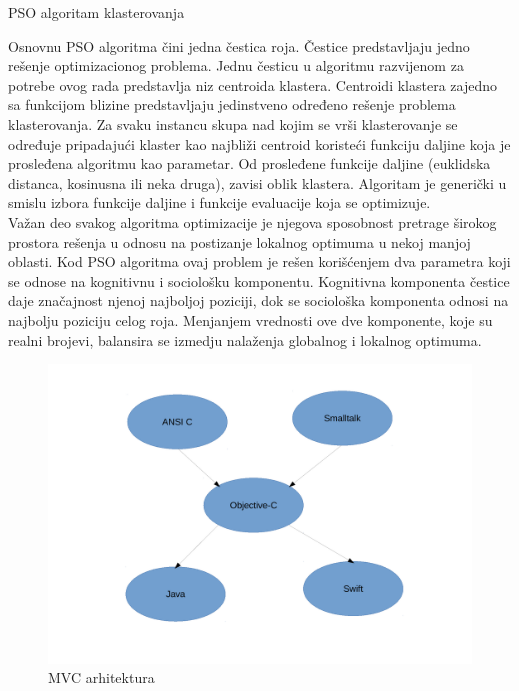 \documentclass[a4paper, twocolumn]{article}
\begin{document}
{\begin{algorithm}
 \caption{PSO algoritam klasterovanja}
 \label{pseudokod}
\end{algorithm}

Osnovnu PSO algoritma čini jedna čestica roja. Čestice predstavljaju jedno rešenje optimizacionog problema.
Jednu česticu u algoritmu razvijenom za potrebe ovog rada predstavlja niz centroida klastera.
Centroidi klastera zajedno sa funkcijom blizine predstavljaju jedinstveno određeno rešenje problema klasterovanja. Za svaku instancu skupa nad kojim se vrši klasterovanje se određuje pripadajući klaster kao najbliži centroid koristeći funkciju daljine koja je prosleđena algoritmu kao parametar.
Od prosleđene funkcije daljine (euklidska distanca, kosinusna ili neka druga), zavisi oblik klastera.
Algoritam je generički u smislu izbora funkcije daljine i funkcije evaluacije koja se optimizuje.\\

Važan deo svakog algoritma optimizacije je njegova sposobnost pretrage širokog prostora rešenja u odnosu na postizanje lokalnog optimuma u nekoj manjoj oblasti. Kod PSO algoritma ovaj problem je rešen korišćenjem dva parametra koji se odnose na kognitivnu i sociološku komponentu.
Kognitivna komponenta čestice daje značajnost njenoj najboljoj poziciji, dok se sociološka komponenta odnosi na najbolju poziciju celog roja.
Menjanjem vrednosti ove dve komponente, koje su realni brojevi, balansira se izmedju nalaženja globalnog i lokalnog optimuma.\\
\begin{figure}[h!]
	\begin{center}
	\includegraphics[scale=0.5]{razvojno_stablo}
	\caption{MVC arhitektura}	
	\label{fig:MVC}
	\end{center}
\end{figure}

}
\end{document}

